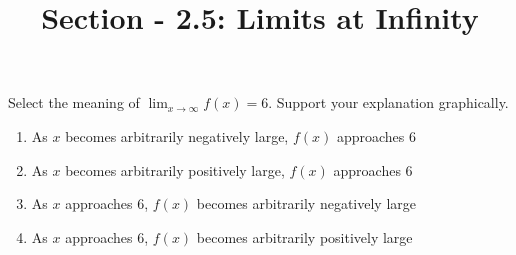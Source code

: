 \documentclass[nooutcomes]{ximera}
\title{Section - 2.5:  Limits at Infinity}
\begin{document}
\begin{abstract}		\end{abstract}
\maketitle

\begin{problem}
	Select the meaning of $\lim_{x \to \infty} f(x)=6$.  Support your explanation graphically.

	\begin{enumerate}
	\item As $x$ becomes arbitrarily negatively large, $f(x)$ approaches $6$
	\item As $x$ becomes arbitrarily positively large, $f(x)$ approaches $6$
	\item As $x$ approaches 6, $f(x)$ becomes arbitrarily negatively large
	\item As $x$ approaches 6, $f(x)$ becomes arbitrarily positively large
	\end{enumerate}


\end{problem}
\end{document}
